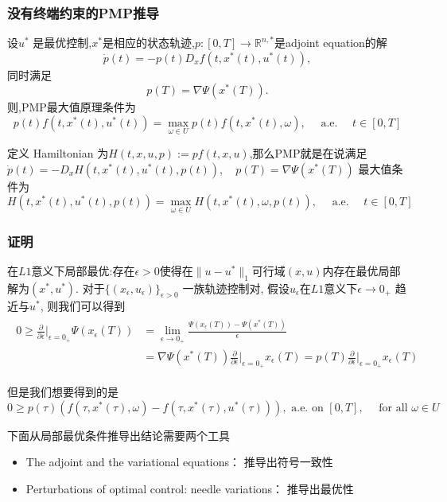 \documentclass[UTF8, aspectratio=169, 9pt]{ctexbeamer}
\begin{document}
\begin{frame}
\frametitle{没有终端约束的PMP推导 }
\begin{theorem}
  设$u^*$ 是最优控制,$x^*$是相应的状态轨迹,$p:[0,T] \rightarrow \mathbb{R}^{n,*}$是adjoint equation的解
  $$
  \dot{p}(t)=-p(t) D_{x} f\left(t, x^{*}(t), u^{*}(t)\right),
  $$
  同时满足
  $$
  p(T)=\nabla \Psi\left(x^{*}(T)\right).
  $$
  则,PMP最大值原理条件为
  $$
  p(t) f\left(t, x^{*}(t), u^{*}(t)\right)=\max _{\omega \in U} p(t) f\left(t, x^{*}(t), \omega\right), \quad \text { a.e. } \quad t \in[0, T]
  $$
\end{theorem}
定义 Hamiltonian 为$H(t, x, u, p):=p f(t, x, u)$,那么PMP就是在说满足
$
\dot{p}(t)=-D_{x} H\left(t, x^{*}(t), u^{*}(t), p(t)\right), \quad p(T)=\nabla \Psi\left(x^{*}(T)\right)
$
最大值条件为
$$H\left(t, x^{*}(t), u^{*}(t), p(t)\right)=\max _{\omega \in U} H\left(t, x^{*}(t), \omega, p(t)\right), \quad \text { a.e. } \quad t \in[0, T]
$$
\end{frame}

\begin{frame}
\frametitle{证明 }

  在$L1$意义下局部最优:存在$\epsilon > 0$使得在$\| u - u^* \|_1$可行域$(x,u)$内存在最优局部解为$(x^*, u^*)$.
  对于$\{ (x_{\epsilon}, u_{\epsilon}) \}_{\epsilon > 0 }$ 一族轨迹控制对, 假设$u_{\epsilon}$在$L1$意义下$\epsilon \rightarrow 0_+$ 趋近与$u^*$, 则我们可以得到
  \begin{align*}
  \begin{split}
  0 \ge \frac{\partial}{\partial \epsilon} \bigg |_{\epsilon=0_+} \Psi( x_{\epsilon}(T) ) & = \lim_{\epsilon \to 0_+} \frac{\Psi(x_{\epsilon}(T)) - \Psi( x^*(T) )}{\epsilon} \\
   &= \nabla \Psi(x^*(T)) \frac{\partial}{\partial \epsilon} \bigg |_{\epsilon=0_+} x_{\epsilon}(T) = p(T) \frac{\partial}{\partial \epsilon} \bigg |_{\epsilon=0_+} x_{\epsilon}(T)
  \end{split}
  \end{align*}

  但是我们想要得到的是
  $$
  0 \geq p(\tau)\left(f\left(\tau, x^{*}(\tau), \omega\right)-f\left(\tau, x^{*}(\tau), u^{*}(\tau)\right)\right), \text { a.e. on }[0, T], \quad \text { for all } \omega \in U
  $$

  下面从局部最优条件推导出结论需要两个工具
  \begin{itemize}
    \item The adjoint and the variational equations：
    推导出符号一致性
    \item Perturbations of optimal control: needle variations：
    推导出最优性
  \end{itemize}


\end{frame}
\end{document}
